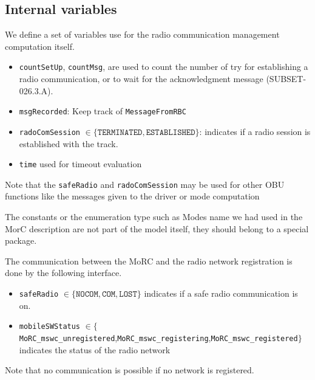 \subsection{Internal variables}
\label{subsec:internalvar}


We define a set of variables use for the radio communication management
computation itself.
\begin{itemize}
\item \verb+countSetUp+, \verb+countMsg+, are used to count the number of try
for establishing a radio communication, or to wait for  the acknowledgment
message (SUBSET-026.3.A).
\item \verb+msgRecorded+: Keep track of \verb+MessageFromRBC+
\item \verb+radoComSession+ $\in \{\mathtt{TERMINATED, ESTABLISHED}\}$: indicates if a radio session is established with the track.
\item \verb+time+ used for timeout evaluation
\end{itemize} 
Note that the \verb+safeRadio+ and \verb+radoComSession+ may be used for other
OBU functions like the messages given to the driver or mode computation

The constants or the enumeration type such as Modes name we had  used in the MorC
description are not part of the model itself, they should
belong to a special package.

The communication between the MoRC and the radio network registration
is done by the following interface.
\begin{itemize}
\item \verb+safeRadio+ $\in \{\mathtt{NOCOM, COM, LOST}\}$ indicates if a safe radio communication is on.
\item \verb+mobileSWStatus+ $\in
  \{$\verb+MoRC_mswc_unregistered+,\verb+MoRC_mswc_registering+,\verb+MoRC_mswc_registered+$\}$
  indicates the status of the radio network
\end{itemize}

Note that no
 communication is possible if no network is registered.


